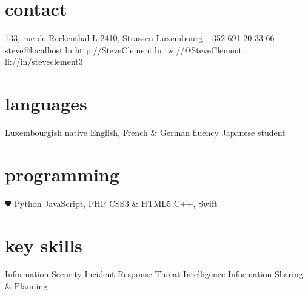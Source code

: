 \documentclass[a4paper]{friggeri-cv} %
\begin{document}


\begin{aside} %
\section{contact}
133, rue de Reckenthal
L-2410, Strassen
Luxembourg
+352 691 20 33 66
{steve@localhost.lu}
{http://SteveClement.lu}
{tw://@SteveClement}
{li://in/steveclement3}
\section{languages}
Luxembourgish native
English, French \& German fluency
Japanese student
\section{programming}
{\color{red} $\varheartsuit$} Python
JavaScript, PHP
CSS3 \& HTML5
C++, Swift
\section{key skills}
Information Security
Incident Response
Threat Intelligence
Information Sharing \& Planning
\end{aside}

\end{document}
